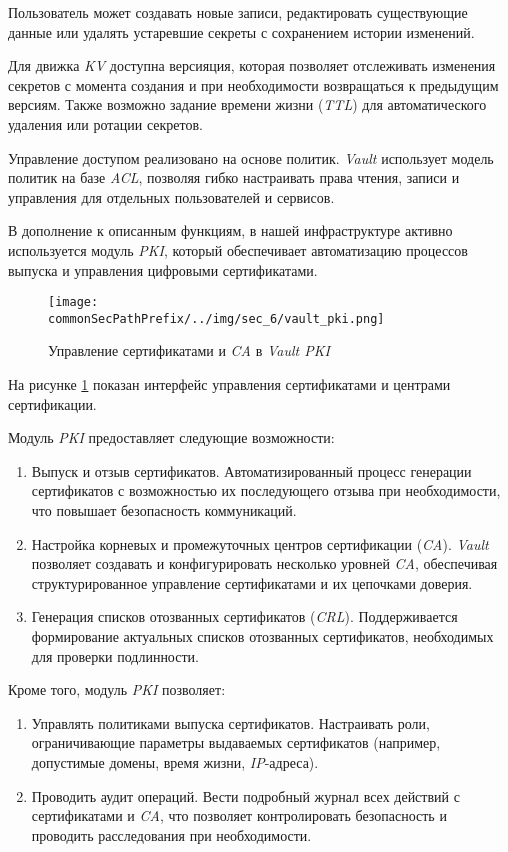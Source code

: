 Пользователь может создавать новые записи, редактировать существующие данные или удалять устаревшие секреты с сохранением истории изменений.

Для движка \textit{KV} доступна версияция, которая позволяет отслеживать изменения секретов с момента создания и при необходимости возвращаться к предыдущим версиям. Также возможно задание времени жизни (\textit{TTL}) для автоматического удаления или ротации секретов.

Управление доступом реализовано на основе политик. \textit{Vault} использует модель политик на базе \textit{ACL}, позволяя гибко настраивать права чтения, записи и управления для отдельных пользователей и сервисов.

В дополнение к описанным функциям, в нашей инфраструктуре активно используется модуль \textit{PKI}, который обеспечивает автоматизацию процессов выпуска и управления цифровыми сертификатами.

\begin{figure}[ht]
    \centering
    \texttt{[image: \\commonSecPathPrefix/../img/sec\_6/vault\_pki.png]}
    \caption{Управление сертификатами и \textit{CA} в \textit{Vault PKI}}
    \label{fig:user_guide:vault_pki}
\end{figure}

На рисунке \ref{fig:user_guide:vault_pki} показан интерфейс управления сертификатами и центрами сертификации.

Модуль \textit{PKI} предоставляет следующие возможности:

\begin{enumerate}
    \item Выпуск и отзыв сертификатов. Автоматизированный процесс генерации сертификатов с возможностью их последующего отзыва при необходимости, что повышает безопасность коммуникаций.
    \item Настройка корневых и промежуточных центров сертификации (\textit{CA}). \textit{Vault} позволяет создавать и конфигурировать несколько уровней \textit{CA}, обеспечивая структурированное управление сертификатами и их цепочками доверия.
    \item Генерация списков отозванных сертификатов (\textit{CRL}). Поддерживается формирование актуальных списков отозванных сертификатов, необходимых для проверки подлинности.
\end{enumerate}

Кроме того, модуль \textit{PKI} позволяет:

\begin{enumerate}
    \item Управлять политиками выпуска сертификатов. Настраивать роли, ограничивающие параметры выдаваемых сертификатов (например, допустимые домены, время жизни, \textit{IP}-адреса).
    \item Проводить аудит операций. Вести подробный журнал всех действий с сертификатами и \textit{CA}, что позволяет контролировать безопасность и проводить расследования при необходимости.
\end{enumerate}


